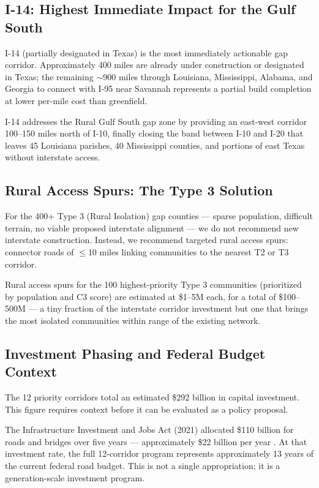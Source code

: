 \subsection{I-14: Highest Immediate Impact for the Gulf South}

I-14 (partially designated in Texas) is the most immediately actionable gap corridor. Approximately 400 miles are already under construction or designated in Texas; the remaining $\sim$900 miles through Louisiana, Mississippi, Alabama, and Georgia to connect with I-95 near Savannah represents a partial build completion at lower per-mile cost than greenfield.

I-14 addresses the Rural Gulf South gap zone by providing an east-west corridor 100--150 miles north of I-10, finally closing the band between I-10 and I-20 that leaves 45 Louisiana parishes, 40 Mississippi counties, and portions of east Texas without interstate access.

\subsection{Rural Access Spurs: The Type 3 Solution}

For the 400+ Type 3 (Rural Isolation) gap counties --- sparse population, difficult terrain, no viable proposed interstate alignment --- we do not recommend new interstate construction. Instead, we recommend targeted rural access spurs: connector roads of $\leq 10$ miles linking communities to the nearest T2 or T3 corridor.

Rural access spurs for the 100 highest-priority Type 3 communities (prioritized by population and C3 score) are estimated at \$1--5M each, for a total of \$100--500M --- a tiny fraction of the interstate corridor investment but one that brings the most isolated communities within range of the existing network.

\subsection{Investment Phasing and Federal Budget Context}

The 12 priority corridors total an estimated \$292 billion in capital investment. This figure requires context before it can be evaluated as a policy proposal.

The Infrastructure Investment and Jobs Act (2021) allocated \$110 billion for roads and bridges over five years --- approximately \$22 billion per year \citep{IIJA2021}. At that investment rate, the full 12-corridor program represents approximately 13 years of the current federal road budget. This is not a single appropriation; it is a generation-scale investment program.

